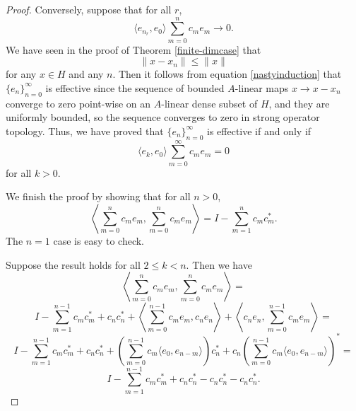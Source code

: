 \documentclass[11pt]{amsart}
\theoremstyle{definition}
\numberwithin{equation}{section}
\begin{document}
\begin{proof}
Conversely, suppose that for all $r$,
$$\langle e_{n_{r}},e_{0}\rangle \sum_{m=0}^{n}c_{m}e_{m}\to 0.$$
We have seen in the proof of Theorem \ref{finite-dimcase} that $$\|x-x_{n}\|\leq \|x\|$$ for any $x\in H$ and any $n$. Then it follows from equation \ref{nastyinduction} that $\{e_{n}\}_{n=0}^{\infty}$ is effective since the sequence of bounded $A$-linear maps $x\to x-x_{n}$ converge to zero point-wise on an $A$-linear dense subset of $H$, and they are uniformly bounded, so the sequence converges to zero in strong operator topology.
Thus, we have proved that $\{e_{n}\}_{n=0}^{\infty}$ is effective if and only if $$\langle e_{k},e_{0}\rangle \sum_{m=0}^{\infty}c_{m}e_{m}=0$$ for all $k>0$.

We finish the proof by showing that for all $n>0$,
$$\left \langle \sum_{m=0}^{n}c_{m}e_{m}, \sum_{m=0}^{n}c_{m}e_{m} \right\rangle =I-\sum_{m=1}^{n}c_{m}c_{m}^{*}.$$
The $n=1$ case is easy to check.

Suppose the result holds for all $2\leq k<n$.
Then we have
$$\left \langle \sum_{m=0}^{n}c_{m}e_{m}, \sum_{m=0}^{n}c_{m}e_{m} \right\rangle=$$
$$I-\sum_{m=1}^{n-1}c_{m}c_{m}^{*}+c_{n}c_{n}^{*}+\left\langle \sum_{m=0}^{n-1}c_{m}e_{m}, c_{n}e_{n} \right\rangle + \left\langle c_{n}e_{n}, \sum_{m=0}^{n-1}c_{m}e_{m} \right\rangle=$$
$$I-\sum_{m=1}^{n-1}c_{m}c_{m}^{*}+c_{n}c_{n}^{*}+\left(\sum_{m=0}^{n-1}c_{m}\langle e_{0},e_{n-m}\rangle \right)c_{n}^{*}+c_{n}\left(\sum_{m=0}^{n-1}c_{m}\langle e_{0},e_{n-m}\rangle \right)^{*}=$$
$$I-\sum_{m=1}^{n-1}c_{m}c_{m}^{*}+c_{n}c_{n}^{*}-c_{n}c_{n}^{*}-c_{n}c_{n}^{*}.$$

\end{proof}
\end{document}
